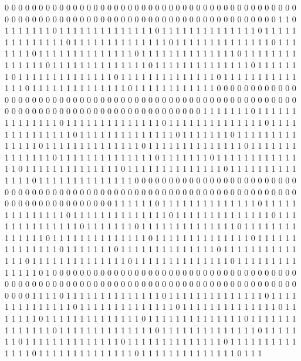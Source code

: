 0 0 0 0 0 0 0 0 0 0 0 0 0 0 0 0 0 0 0 0 0 0 0 0 0 0 0 0 0 0 0 0 0 0 0 0 0 0 0 0 0 0 0 0 0 0 0 0 0 0 0 0 0 0 0 0 0 0 0 0 0 0 0 0 0 0 0 0 0 0 0 0 0 0 0 0 0 0 0 0 0 0 0 
1 1 0 1 1 1 1 1 1 1 0 1 1 1 1 1 1 1 1 1 1 1 1 1 1 0 1 1 1 1 1 1 1 1 1 1 1 1 1 1 0 1 1 1 1 1 1 1 1 1 1 1 1 1 1 0 1 1 1 1 1 1 1 1 1 1 1 1 1 1 0 1 1 1 1 1 1 1 1 1 1 1 1 
1 1 0 1 1 1 1 1 1 1 0 1 1 1 1 1 1 1 1 1 1 1 1 1 1 0 1 1 1 1 1 1 1 1 1 1 1 1 1 1 0 1 1 1 1 1 1 1 1 1 1 1 1 1 1 0 1 1 1 1 1 1 1 1 1 1 1 1 1 1 0 1 1 1 1 1 1 1 1 1 1 1 1 
1 1 0 1 1 1 1 1 1 1 0 1 1 1 1 1 1 1 1 1 1 1 1 1 1 0 1 1 1 1 1 1 1 1 1 1 1 1 1 1 0 1 1 1 1 1 1 1 1 1 1 1 1 1 1 0 1 1 1 1 1 1 1 1 1 1 1 1 1 1 0 1 1 1 1 1 1 1 1 1 1 1 1 
0 0 0 0 0 0 0 0 0 0 0 0 0 0 0 0 0 0 0 0 0 0 0 0 0 0 0 0 0 0 0 0 0 0 0 0 0 0 0 0 0 0 0 0 0 0 0 0 0 0 0 0 0 0 0 0 0 0 0 0 0 0 0 0 0 0 0 0 0 0 0 0 0 0 0 0 0 0 0 0 0 0 0 
0 1 1 1 1 1 1 1 0 1 1 1 1 1 1 1 1 1 1 1 1 1 1 0 1 1 1 1 1 1 1 1 1 1 1 1 1 1 0 1 1 1 1 1 1 1 1 1 1 1 1 1 1 0 1 1 1 1 1 1 1 1 1 1 1 1 1 1 0 1 1 1 1 1 1 1 1 1 1 1 1 1 1 
0 1 1 1 1 1 1 1 0 1 1 1 1 1 1 1 1 1 1 1 1 1 1 0 1 1 1 1 1 1 1 1 1 1 1 1 1 1 0 1 1 1 1 1 1 1 1 1 1 1 1 1 1 0 1 1 1 1 1 1 1 1 1 1 1 1 1 1 0 1 1 1 1 1 1 1 1 1 1 1 1 1 1 
0 1 1 1 1 1 1 1 0 1 1 1 1 1 1 1 1 1 1 1 1 1 1 0 1 1 1 1 1 1 1 1 1 1 1 1 1 1 0 1 1 1 1 1 1 1 1 1 1 1 1 1 1 0 1 1 1 1 1 1 1 1 1 1 1 1 1 1 0 1 1 1 1 1 1 1 1 1 1 1 1 1 1 
0 0 0 0 0 0 0 0 0 0 0 0 0 0 0 0 0 0 0 0 0 0 0 0 0 0 0 0 0 0 0 0 0 0 0 0 0 0 0 0 0 0 0 0 0 0 0 0 0 0 0 0 0 0 0 0 0 0 0 0 0 0 0 0 0 0 0 0 0 0 0 0 0 0 0 0 0 0 0 0 0 0 0 
1 1 1 1 1 1 0 1 1 1 1 1 1 1 1 1 1 1 1 1 1 0 1 1 1 1 1 1 1 1 1 1 1 1 1 1 0 1 1 1 1 1 1 1 1 1 1 1 1 1 1 0 1 1 1 1 1 1 1 1 1 1 1 1 1 1 0 1 1 1 1 1 1 1 1 1 1 1 1 1 1 0 1 
1 1 1 1 1 1 0 1 1 1 1 1 1 1 1 1 1 1 1 1 1 0 1 1 1 1 1 1 1 1 1 1 1 1 1 1 0 1 1 1 1 1 1 1 1 1 1 1 1 1 1 0 1 1 1 1 1 1 1 1 1 1 1 1 1 1 0 1 1 1 1 1 1 1 1 1 1 1 1 1 1 0 1 
1 1 1 1 1 1 0 1 1 1 1 1 1 1 1 1 1 1 1 1 1 0 1 1 1 1 1 1 1 1 1 1 1 1 1 1 0 1 1 1 1 1 1 1 1 1 1 1 1 1 1 0 1 1 1 1 1 1 1 1 1 1 1 1 1 1 0 1 1 1 1 1 1 1 1 1 1 1 1 1 1 0 1 
0 0 0 0 0 0 0 0 0 0 0 0 0 0 0 0 0 0 0 0 0 0 0 0 0 0 0 0 0 0 0 0 0 0 0 0 0 0 0 0 0 0 0 0 0 0 0 0 0 0 0 0 0 0 0 0 0 0 0 0 0 0 0 0 0 0 0 0 0 0 0 0 0 0 0 0 0 0 0 0 0 0 0 
1 1 1 1 0 1 1 1 1 1 1 1 1 1 1 1 1 1 1 0 1 1 1 1 1 1 1 1 1 1 1 1 1 1 0 1 1 1 1 1 1 1 1 1 1 1 1 1 1 0 1 1 1 1 1 1 1 1 1 1 1 1 1 1 0 1 1 1 1 1 1 1 1 1 1 1 1 1 1 0 1 1 1 
1 1 1 1 0 1 1 1 1 1 1 1 1 1 1 1 1 1 1 0 1 1 1 1 1 1 1 1 1 1 1 1 1 1 0 1 1 1 1 1 1 1 1 1 1 1 1 1 1 0 1 1 1 1 1 1 1 1 1 1 1 1 1 1 0 1 1 1 1 1 1 1 1 1 1 1 1 1 1 0 1 1 1 
1 1 1 1 0 1 1 1 1 1 1 1 1 1 1 1 1 1 1 0 1 1 1 1 1 1 1 1 1 1 1 1 1 1 0 1 1 1 1 1 1 1 1 1 1 1 1 1 1 0 1 1 1 1 1 1 1 1 1 1 1 1 1 1 0 1 1 1 1 1 1 1 1 1 1 1 1 1 1 0 1 1 1 
